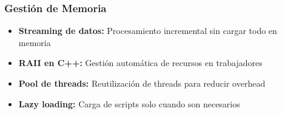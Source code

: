 \subsubsection{Gestión de Memoria}

\begin{itemize}
    \item \textbf{Streaming de datos:} Procesamiento incremental sin cargar todo en memoria
    \item \textbf{RAII en C++:} Gestión automática de recursos en trabajadores
    \item \textbf{Pool de threads:} Reutilización de threads para reducir overhead
    \item \textbf{Lazy loading:} Carga de scripts solo cuando son necesarios
\end{itemize}
